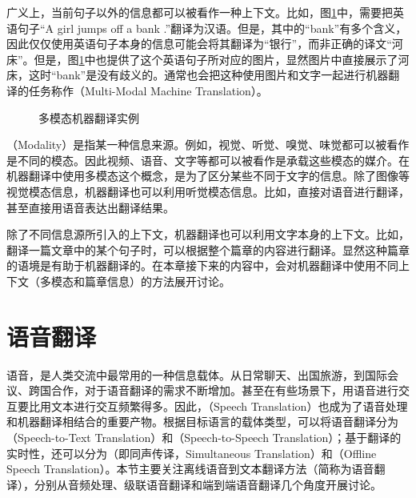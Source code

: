 \parinterval 广义上，当前句子以外的信息都可以被看作一种上下文。比如，图\ref{fig:17-1}中，需要把英语句子“A girl jumps off a bank .”翻译为汉语。但是，其中的“bank”有多个含义，因此仅仅使用英语句子本身的信息可能会将其翻译为“银行”，而非正确的译文“河床”。但是，图\ref{fig:17-1}中也提供了这个英语句子所对应的图片，显然图片中直接展示了河床，这时“bank”是没有歧义的。通常也会把这种使用图片和文字一起进行机器翻译的任务称作{\small{}}（Multi-Modal Machine Translation）。

\begin{figure}[htp]
    \centering

    \caption{多模态机器翻译实例}
    \label{fig:17-1}
\end{figure}
（Modality）是指某一种信息来源。例如，视觉、听觉、嗅觉、味觉都可以被看作是不同的模态。因此视频、语音、文字等都可以被看作是承载这些模态的媒介。在机器翻译中使用多模态这个概念，是为了区分某些不同于文字的信息。除了图像等视觉模态信息，机器翻译也可以利用听觉模态信息。比如，直接对语音进行翻译，甚至直接用语音表达出翻译结果。

\parinterval 除了不同信息源所引入的上下文，机器翻译也可以利用文字本身的上下文。比如，翻译一篇文章中的某个句子时，可以根据整个篇章的内容进行翻译。显然这种篇章的语境是有助于机器翻译的。在本章接下来的内容中，会对机器翻译中使用不同上下文（多模态和篇章信息）的方法展开讨论。

\sectionnewpage
\section{语音翻译}

\parinterval 语音，是人类交流中最常用的一种信息载体。从日常聊天、出国旅游，到国际会议、跨国合作，对于语音翻译的需求不断增加。甚至在有些场景下，用语音进行交互要比用文本进行交互频繁得多。因此，{\small{}}（Speech Translation）也成为了语音处理和机器翻译相结合的重要产物。根据目标语言的载体类型，可以将语音翻译分为{\small{}}（Speech-to-Text Translation）和{\small{}}（Speech-to-Speech Translation）；基于翻译的实时性，还可以分为{\small{}}（即同声传译，Simultaneous Translation）和{\small{}}（Offline Speech Translation）。本节主要关注离线语音到文本翻译方法（简称为语音翻译），分别从音频处理、级联语音翻译和端到端语音翻译几个角度开展讨论。

